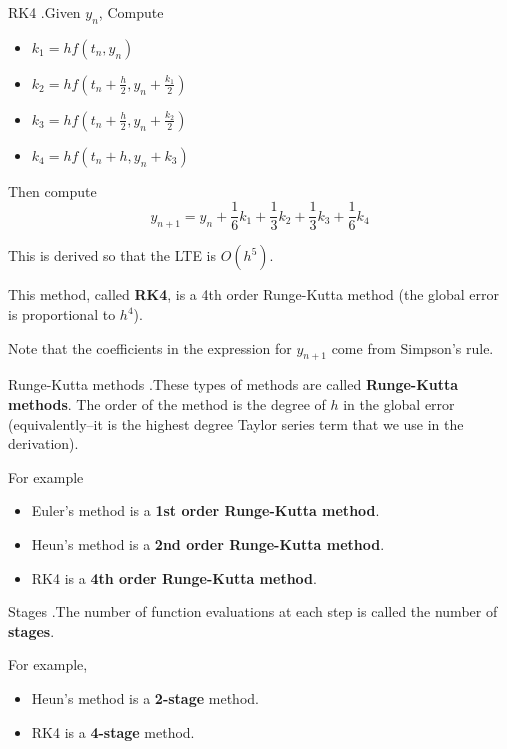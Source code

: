 \documentclass[12pt,letterpaper]{article}
\begin{document}
\begin{algo}{RK4}
.Given $y_n$,
Compute
\begin{itemize}
	\item[] $k_1 = h f(t_n, y_n)$
	\item[] $k_2 = hf(t_n + \frac{h}{2}, y_n + \frac{k_1}{2})$
	\item[] $k_3 = hf(t_n + \frac{h}{2}, y_n + \frac{k_2}{2})$
	\item[] $k_4 = hf(t_n + h, y_n + k_3)$
\end{itemize}

Then compute
\begin{equation}
	y_{n+1} = y_n + \frac{1}{6}k_1 + \frac{1}{3}k_2 + \frac{1}{3}k_3 + \frac{1}{6}k_4
\end{equation}

This is derived so that the LTE is $O(h^5)$.

This method, called \textbf{RK4}, is a 4th order Runge-Kutta method (the global error is proportional to $h^4$).
\end{algo}

Note that the coefficients in the expression for $y_{n+1}$ come from Simpson's rule.

\begin{defn}{Runge-Kutta methods}
.These types of methods are called \textbf{Runge-Kutta methods}. The order of the method is the degree of $h$ in the global error (equivalently--it is the highest degree Taylor series term that we use in the derivation).

For example
\begin{itemize}
	\item Euler's method is a \textbf{1st order Runge-Kutta method}.
	\item Heun's method is a \textbf{2nd order Runge-Kutta method}.
	\item RK4 is a \textbf{4th order Runge-Kutta method}.
\end{itemize}
\end{defn}

\begin{defn}{Stages}
.The number of function evaluations at each step is called the number of \textbf{stages}.

For example,
\begin{itemize}
	\item Heun's method is a \textbf{2-stage} method.
	\item RK4 is a \textbf{4-stage} method.
\end{itemize}
\end{defn}
\end{document}
